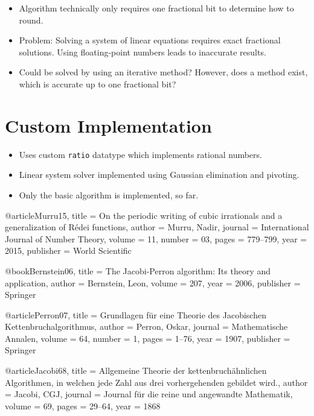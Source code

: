 \documentclass[english,version-2020-11]{uzl-thesis}
\begin{document}
\begin{itemize}
  \item Algorithm technically only requires one fractional bit to determine how to round.
  \item Problem: Solving a system of linear equations requires exact fractional solutions.
    Using floating-point numbers leads to inaccurate results.
  \item Could be solved by using an iterative method? However, does a method
    exist, which is accurate up to one fractional bit?
\end{itemize}

\section{Custom Implementation}

\begin{itemize}
  \item Uses custom \texttt{ratio} datatype which implements rational numbers.
  \item Linear system solver implemented using Gaussian elimination and pivoting.
  \item Only the basic algorithm is implemented, so far.
\end{itemize}

\begin{bibtex-entries}
@article{Murru15,
  title     = {On the periodic writing of cubic irrationals and a generalization of R{\'e}dei functions},
  author    = {Murru, Nadir},
  journal   = {International Journal of Number Theory},
  volume    = {11},
  number    = {03},
  pages     = {779--799},
  year      = {2015},
  publisher = {World Scientific}
}

@book{Bernstein06,
  title     = {The Jacobi-Perron algorithm: Its theory and application},
  author    = {Bernstein, Leon},
  volume    = {207},
  year      = {2006},
  publisher = {Springer}
}

@article{Perron07,
  title     = {Grundlagen f{\"u}r eine Theorie des Jacobischen Kettenbruchalgorithmus},
  author    = {Perron, Oskar},
  journal   = {Mathematische Annalen},
  volume    = {64},
  number    = {1},
  pages     = {1--76},
  year      = {1907},
  publisher = {Springer}
}

@article{Jacobi68,
  title   = {Allgemeine Theorie der kettenbruch{\"a}hnlichen Algorithmen, in welchen jede Zahl aus drei vorhergehenden gebildet wird.},
  author  = {Jacobi, CGJ},
  journal = {Journal f{\"u}r die reine und angewandte Mathematik},
  volume  = {69},
  pages   = {29--64},
  year    = {1868}
}
\end{bibtex-entries}
\end{document}
